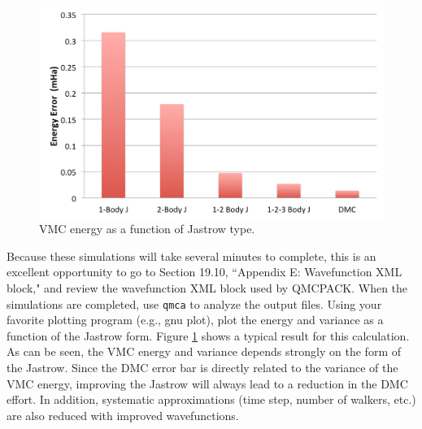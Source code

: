 \begin{figure}
\begin{center}
\includegraphics[trim = 0mm 0mm 0mm 0mm, clip,width=0.75\columnwidth]{./figures/lab_advanced_molecules_vmc_jastrow.png}
\end{center}
\caption{VMC energy as a function of Jastrow type.}
\label{fig:lam_vmc_jastrow}
\end{figure}

Because these simulations will take several minutes to complete, this is an excellent opportunity
to go to Section 19.10, ``Appendix E: Wavefunction XML block," and review the wavefunction XML block used by QMCPACK. When the
simulations are completed, use \texttt{qmca} to analyze the output files. Using your favorite plotting
program (e.g., gnu plot), plot the energy and variance as a function of the Jastrow form.
Figure \ref{fig:lam_vmc_jastrow} shows a typical result for this calculation. As can be seen, the VMC energy and
variance depends strongly on the form of the Jastrow. Since the DMC error bar is directly
related to the variance of the VMC energy, improving the Jastrow will always lead to a
reduction in the DMC effort. In addition, systematic approximations (time step, number of
walkers, etc.) are also reduced with improved wavefunctions.


